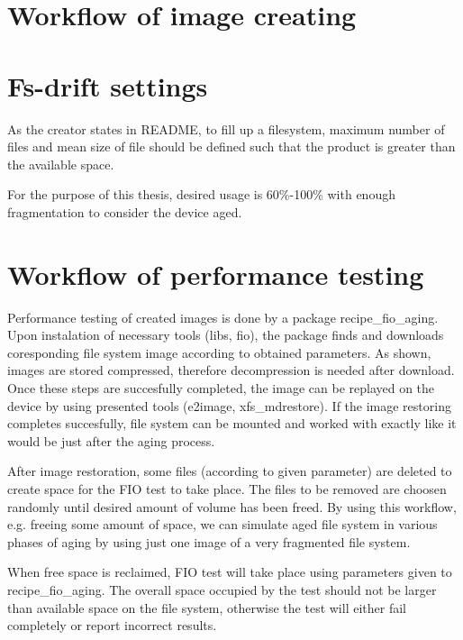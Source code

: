 \documentclass[
  color, %
  table, %
  lof,   %
  lot,   %
]{fithesis3}
\begin{document}

\section{Workflow of image creating}

\section{Fs-drift settings}
As the creator states in README, to fill up a filesystem, maximum number of files and mean size of file should be defined such that the product is greater than the available space.

For the purpose of this thesis, desired usage is 60\%-100\% with enough fragmentation to consider the device aged.

\section{Workflow of performance testing}
Performance testing of created images is done by a package recipe\_fio\_aging. Upon instalation of necessary tools (libs, fio), the package finds and downloads coresponding file system image according to obtained parameters. As shown, images are stored compressed, therefore decompression is needed after download. Once these steps are succesfully completed, the image can be replayed on the device by using presented tools (e2image, xfs\_mdrestore). If the image restoring completes succesfully, file system can be mounted and worked with exactly like it would be just after the aging process.

After image restoration, some files (according to given parameter) are deleted to create space for the FIO test to take place. The files to be removed are choosen randomly until desired amount of volume has been freed. By using this workflow, e.g. freeing some amount of space, we can simulate aged file system in various phases of aging by using just one image of a very fragmented file system.

When free space is reclaimed, FIO test will take place using parameters given to recipe\_fio\_aging. The overall space occupied by the test should not be larger than available space on the file system, otherwise the test will either fail completely or report incorrect results.
\end{document}
